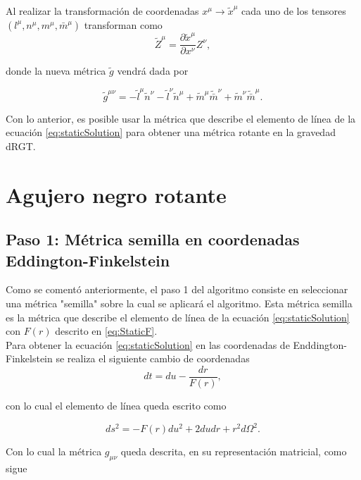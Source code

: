 Al realizar la transformación de coordenadas $x^\mu\rightarrow \tilde{x}^\mu$ cada uno de los tensores $(l^\mu,n^\mu,m^\mu,\bar{m}^\mu)$ transforman como 
\begin{equation}
    \tilde{Z}^\mu=\dfrac{\partial \tilde{x}^\mu}{\partial x^\nu}Z^\nu,
    \label{eq:tetradTransformation}
\end{equation}

donde la nueva métrica $\tilde{g}$ vendrá dada por

\begin{equation}
    \tilde{g}^{\mu\nu}=-\tilde{l}^\mu \tilde{n}^\nu-\tilde{l}^\nu \tilde{n}^\mu+\tilde{m}^\mu \tilde{\bar{m}}^\nu+\tilde{m}^\nu \tilde{\bar{m}}^\mu.
    \label{eq:TetradMetricComplex}
\end{equation}

Con lo anterior, es posible usar la métrica que describe el elemento de línea de la ecuación \eqref{eq:staticSolution} para obtener una métrica rotante en la gravedad dRGT.

\section{Agujero negro rotante}

\subsection{Paso 1: Métrica semilla en coordenadas Eddington-Finkelstein}
    Como se comentó anteriormente, el paso 1 del algoritmo consiste en seleccionar una métrica "semilla" sobre la cual se aplicará el algoritmo. Esta métrica semilla es la métrica que describe el elemento de línea de la ecuación \eqref{eq:staticSolution} con $F(r)$ descrito en \eqref{eq:StaticF}.\\
    
    Para obtener la ecuación \eqref{eq:staticSolution} en las coordenadas de Enddington-Finkelstein se realiza el siguiente cambio de coordenadas
    \begin{equation}
        dt=du-\dfrac{dr}{F(r)},
    \end{equation}
    
    con lo cual el elemento de línea queda escrito como
    
    \begin{equation}
        ds^2=-F(r)du^2+2dudr+r^2d\Omega^2.
        \label{eq:seedMetricEF}
    \end{equation}
    
    Con lo cual la métrica $g_{\mu\nu}$ queda descrita, en su representación matricial, como sigue
    
